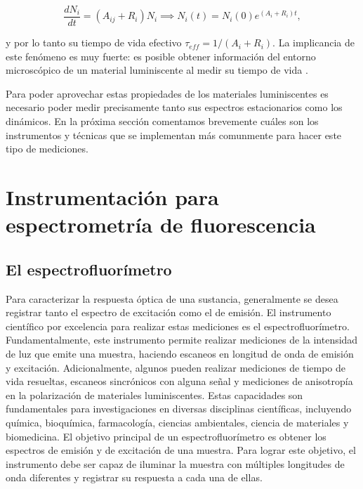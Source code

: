 \begin{equation} \label{eq:lifetime_choques}
    \frac{dN_i}{dt} = (A_{ij} + R_i) N_i \implies N_i(t) = N_i(0)e^{(A_i + R_i) t},
\end{equation}

\noindent y por lo tanto su tiempo de vida efectivo $\tau_{eff} = 1/(A_i + R_i)$. 
La implicancia de este fenómeno es muy fuerte: es posible obtener información del entorno microscópico de un material luminiscente al medir su tiempo de vida \cite{ryder_timedomain_2001}.

Para poder aprovechar estas propiedades de los materiales luminiscentes es necesario poder medir precisamente tanto sus espectros estacionarios como los dinámicos. 
En la próxima sección comentamos brevemente cuáles son los instrumentos y técnicas que se implementan más comunmente para hacer este tipo de mediciones.


\section{Instrumentación para espectrometría de fluorescencia}

\subsection{El espectrofluorímetro}

Para caracterizar la respuesta óptica de una sustancia, generalmente se desea registrar tanto el espectro de excitación como el de emisión. 
El instrumento científico por excelencia para realizar estas mediciones es el espectrofluorímetro. 
Fundamentalmente, este instrumento permite realizar mediciones de la intensidad de luz que emite una muestra, haciendo escaneos en longitud de onda de emisión y excitación.
Adicionalmente, algunos pueden realizar mediciones de tiempo de vida resueltas, escaneos sincrónicos con alguna señal y mediciones de anisotropía en la polarización de materiales luminiscentes.
Estas capacidades son fundamentales para investigaciones en diversas disciplinas científicas, incluyendo química, bioquímica, farmacología, ciencias ambientales, ciencia de materiales y biomedicina.
El objetivo principal de un espectrofluorímetro es obtener los espectros de emisión y de excitación de una muestra.
Para lograr este objetivo, el instrumento debe ser capaz de iluminar la muestra con múltiples longitudes de onda diferentes y registrar su respuesta a cada una de ellas.

